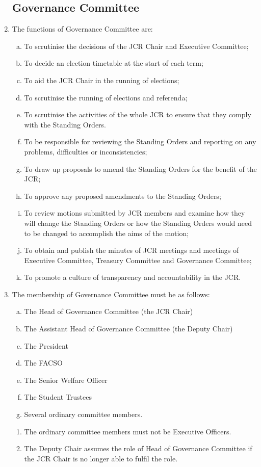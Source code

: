 \documentclass[12pt]{article}
\begin{document}
\begin{enumerate}
    \subsection{Governance Committee}
    \item The functions of Governance Committee are:
    \begin{enumerate}[(a)]
        \item To scrutinise the decisions of the JCR Chair and Executive Committee;
        \item To decide an election timetable at the start of each term;
        \item To aid the JCR Chair in the running of elections;
        \item To scrutinise the running of elections and referenda;
        \item To scrutinise the activities of the whole JCR to ensure that they comply with the Standing Orders.
        \item To be responsible for reviewing the Standing Orders and reporting on any problems, difficulties or inconsistencies;
        \item To draw up proposals to amend the Standing Orders for the benefit of the JCR;
        \item To approve any proposed amendments to the Standing Orders;
        \item To review motions submitted by JCR members and examine how they will change the Standing Orders or how the Standing Orders would need to be changed to accomplish the aims of the motion;
        \item To obtain and publish the minutes of JCR meetings and meetings of Executive Committee, Treasury Committee and Governance Committee;
        \item To promote a culture of transparency and accountability in the JCR.
    \end{enumerate}
    \item The membership of Governance Committee must be as follows:
    \begin{enumerate}[(a)]
        \item The Head of Governance Committee (the JCR Chair)
        \item The Assistant Head of Governance Committee (the Deputy Chair)
        \item The President
        \item The FACSO
        \item The Senior Welfare Officer
        \item The Student Trustees
        \item Several ordinary committee members.
    \end{enumerate}
    \begin{enumerate}
        \item The ordinary committee members must not be Executive Officers.
        \item The Deputy Chair assumes the role of Head of Governance Committee if the JCR Chair is no longer able to fulfil the role.
    \end{enumerate}


\end{enumerate}
\end{document}
